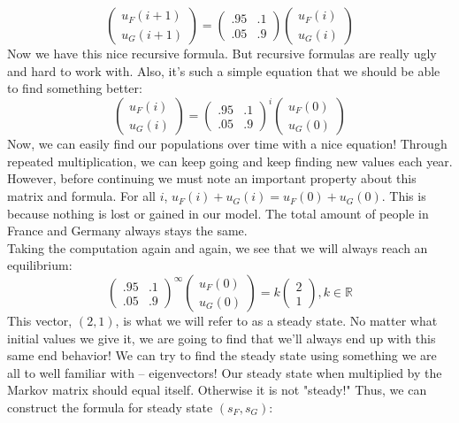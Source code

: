 \documentclass[12pt]{amsart}
\begin{document}
\[\begin{pmatrix}u_F(i+1)\\u_G(i+1)\end{pmatrix} = \begin{pmatrix}.95&.1\\.05&.9\end{pmatrix}\begin{pmatrix}u_F(i)\\u_G(i)\end{pmatrix}\]
Now we have this nice recursive formula. But recursive formulas are really ugly and hard to work with. Also, it's such a simple equation that we should be able to find something better:
\[\begin{pmatrix}u_F(i)\\u_G(i)\end{pmatrix} = \begin{pmatrix}.95&.1\\.05&.9\end{pmatrix}^i\begin{pmatrix}u_F(0)\\u_G(0)\end{pmatrix}\]
Now, we can easily find our populations over time with a nice equation! Through repeated multiplication, we can keep going and keep finding new values each year. However, before continuing we must note an important property about this matrix and formula. For all $i$, $u_F(i) + u_G(i) = u_F(0) + u_G(0)$. This is because nothing is lost or gained in our model. The total amount of people in France and Germany always stays the same.\\
Taking the computation again and again, we see that we will always reach an equilibrium:
\[\begin{pmatrix}.95&.1\\.05&.9\end{pmatrix}^\infty \begin{pmatrix}u_F(0)\\u_G(0)\end{pmatrix} = k\begin{pmatrix}2\\1\end{pmatrix}, k\in\mathbb{R}\]
This vector, $(2, 1)$, is what we will refer to as a steady state. No matter what initial values we give it, we are going to find that we'll always end up with this same end behavior! We can try to find the steady state using something we are all to well familiar with -- eigenvectors! Our steady state when multiplied by the Markov matrix should equal itself. Otherwise it is not "steady!" Thus, we can construct the formula for steady state $(s_F, s_G)$:
\end{document}
